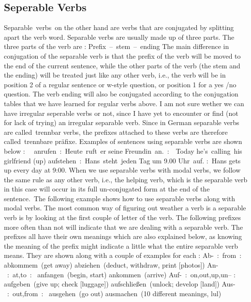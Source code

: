 \documentclass[a4paper,12pt]{article}
\begin{document}
\subsection{\bf{Seperable Verbs}}
\begin{adjustwidth}{2em}{0pt}
\label{sec:seperable_verbs}

Separable verbs on the other hand are verbs that are conjugated by splitting
apart the verb word. Separable verbs are usually made up of three parts. The
three parts of the verb are :
Prefix – stem – ending
The main difference in conjugation of the separable verb is that the prefix of
the verb will be moved to the end of the current sentence, while the other parts
of the verb (the stem and the ending) will be treated just like any other verb,
i.e., the verb will be in position 2 of a regular sentence or w-style question,
or position 1 for a yes /no question. The verb ending will also be conjugated
according to the conjugation tables that we have learned for regular verbs
above. I am not sure wether we can have irregular seperable verbs or not, since
I have yet to encounter or find (not for lack of trying) an irregular separable
verb.
Since in German separable verbs are called trennbar verbs, the prefixes attached
to these verbs are therefore called trennbare präfixe.
Examples of sentences using separable verbs are shown below : 
 anrufen : Heute ruft er seine Freundin an. :  Today he’s calling his girlfriend
(up)
aufstehen : Hans steht jeden Tag um 9.00 Uhr auf. : Hans gets up every day at
9:00.
When we use separable verbs with modal verbs, we follow the same rule as any
other verb, i.e., the helping verb, which is the separable verb in this case
will occur in its full un-conjugated form at the end of the sentence. The
following example shows how to use separable verbs along with modal verbs.
The most common way of figuring out weather a verb is a separable verb is by
looking at the first couple of letter of the verb. The following prefixes more
often than not will indicate that we are dealing with a separable verb. The
prefixes all have their own meanings which are also explained below, as knowing
the meaning of the prefix might indicate a little what the entire separable verb
means. They are shown along with a couple of examples for each :
Ab- : from : 
abkommem (get away)
abziehen (deduct, withdraw, print [photos])
An- : at,to : 
anfangen (begin, start)
ankommen (arrive)
Auf- : on,out,up,un– : 
aufgeben (give up; check [luggage])
aufschließen (unlock; develop [land])
Aus- : out,from : 
ausgehen (go out)
ausmachen (10 different meanings, lul)

\end{adjustwidth}
\end{document}
